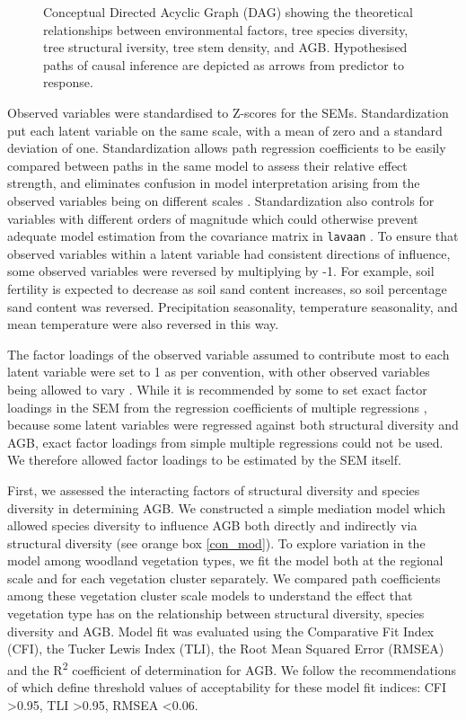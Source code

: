 \documentclass[11pt,a4paper]{article}
\begin{document}
\begin{figure}[H]
\centering
	
	\caption{Conceptual Directed Acyclic Graph (DAG) showing the theoretical relationships between environmental factors, tree species diversity, tree structural iversity, tree stem density, and AGB. Hypothesised paths of causal inference are depicted as arrows from predictor to response.}
	\label{con_mod}
\end{figure}

Observed variables were standardised to Z-scores for the SEMs. Standardization put each latent variable on the same scale, with a mean of zero and a standard deviation of one. Standardization allows path regression coefficients to be easily compared between paths in the same model to assess their relative effect strength, and eliminates confusion in model interpretation arising from the observed variables being on different scales \citep{}. Standardization also controls for variables with different orders of magnitude which could otherwise prevent adequate model estimation from the covariance matrix in \verb|lavaan| \citep{}. To ensure that observed variables within a latent variable had consistent directions of influence, some observed variables were reversed by multiplying by -1. For example, soil fertility is expected to decrease as soil sand content increases, so soil percentage sand content was reversed. Precipitation seasonality, temperature seasonality, and mean temperature were also reversed in this way.

The factor loadings of the observed variable assumed to contribute most to each latent variable were set to 1 as per convention, with other observed variables being allowed to vary \citep{}. While it is recommended by some to set exact factor loadings in the SEM from the regression coefficients of multiple regressions \citep{}, because some latent variables were regressed against both structural diversity and AGB, exact factor loadings from simple multiple regressions could not be used. We therefore allowed factor loadings to be estimated by the SEM itself.

First, we assessed the interacting factors of structural diversity and species diversity in determining AGB. We constructed a simple mediation model which allowed species diversity to influence AGB both directly and indirectly via structural diversity (see orange box \autoref{con_mod}). To explore variation in the model among woodland vegetation types, we fit the model both at the regional scale and for each vegetation cluster separately. We compared path coefficients among these vegetation cluster scale models to understand the effect that vegetation type has on the relationship between structural diversity, species diversity and AGB. Model fit was evaluated using the Comparative Fit Index (CFI), the Tucker Lewis Index (TLI), the Root Mean Squared Error (RMSEA) and the R\textsuperscript{2} coefficient of determination for AGB. We follow the recommendations of \citet{Hu1999} which define threshold values of acceptability for these model fit indices: CFI >0.95, TLI >0.95, RMSEA <0.06.
\end{document}
